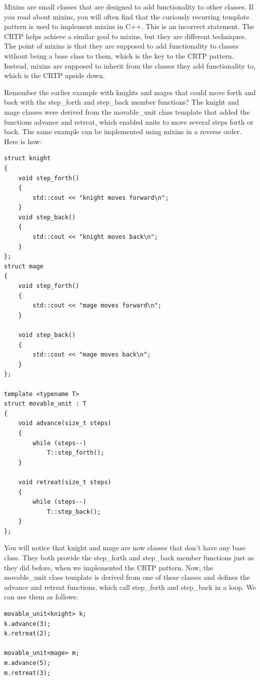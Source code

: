 Mixins are small classes that are designed to add functionality to other classes. If you read about mixins, you will often find that the curiously recurring template pattern is used to implement mixins in C++. This is an incorrect statement. The CRTP helps achieve a similar goal to mixins, but they are different techniques. The point of mixins is that they are supposed to add functionality to classes without being a base class to them, which is the key to the CRTP pattern. Instead, mixins are supposed to inherit from the classes they add functionality to, which is the CRTP upside down.

Remember the earlier example with knights and mages that could move forth and back with the step\_forth and step\_back member functions? The knight and mage classes were derived from the movable\_unit class template that added the functions advance and retreat, which enabled units to move several steps forth or back. The same example can be implemented using mixins in a reverse order. Here is how:

\begin{lstlisting}[style=styleCXX]
struct knight
{
	void step_forth()
	{
		std::cout << "knight moves forward\n";
	}
	void step_back()
	{
		std::cout << "knight moves back\n";
	}
};
struct mage
{
	void step_forth()
	{
		std::cout << "mage moves forward\n";
	}

	void step_back()
	{
		std::cout << "mage moves back\n";
	}
};

template <typename T>
struct movable_unit : T
{
	void advance(size_t steps)
	{
		while (steps--)
			T::step_forth();
	}

	void retreat(size_t steps)
	{
		while (steps--)
			T::step_back();
	}
};
\end{lstlisting}

You will notice that knight and mage are now classes that don’t have any base class. They both provide the step\_forth and step\_back member functions just as they did before, when we implemented the CRTP pattern. Now, the movable\_unit class template is derived from one of these classes and defines the advance and retreat functions, which call step\_forth and step\_back in a loop. We can use them as follows:

\begin{lstlisting}[style=styleCXX]
movable_unit<knight> k;
k.advance(3);
k.retreat(2);

movable_unit<mage> m;
m.advance(5);
m.retreat(3);
\end{lstlisting}


